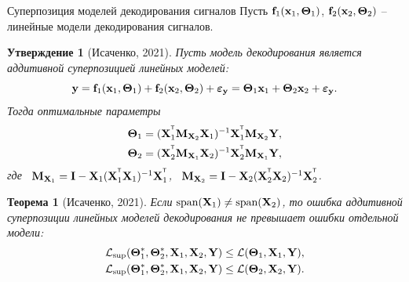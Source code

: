 \documentclass[10pt]{beamer}
\newtheorem{statement}{Утверждение}
\newtheorem{rustheorem}{Теорема}
\begin{document}
\begin{frame}{Суперпозиция моделей декодирования сигналов}
	Пусть $\mathbf{f}_1(\bx_1, \bTheta_1)$, $\mathbf{f}_2(\bx_2, \bTheta_2)$ -- линейные модели декодирования сигналов. 
	\begin{statement}[Исаченко, 2021]
		Пусть модель декодирования является аддитивной суперпозицией линейных моделей:
		\vspace{-0.3cm}
		\[
			\by = \mathbf{f}_1(\bx_1, \bTheta_1) + \mathbf{f}_2(\bx_2, \bTheta_2) + \boldsymbol{\varepsilon}_{\by} = \bTheta_1 \bx_1 + \bTheta_2 \bx_2 + \boldsymbol{\varepsilon}_{\by}.
		\]
		Тогда оптимальные параметры
		\vspace{-0.2cm}
		\begin{align*}
			\bTheta_1 &= (\bX_1^{\T} \bM_{\bX_2} \bX_1)^{-1} \bX_1^{\T} \bM_{\bX_2} \bY, \\
			\bTheta_2 &= (\bX_2^{\T} \bM_{\bX_1} \bX_2)^{-1} \bX_2^{\T} \bM_{\bX_1} \bY,
		\end{align*}
		где \, $\bM_{\bX_1} = \bI - \bX_1 (\bX_1^{\T} \bX_1)^{-1} \bX_1^{\T}$, \, $\bM_{\bX_2} = \bI -\bX_2 (\bX_2^{\T} \bX_2)^{-1} \bX_2^{\T}$.
	\end{statement}
	\begin{rustheorem}[Исаченко, 2021]
		Если $\text{span}(\bX_1) \neq \text{span}(\bX_2)$, то ошибка аддитивной суперпозиции линейных моделей декодирования не превышает ошибки отдельной модели:
		\begin{align*}
			\mathcal{L}_{\textnormal{sup}}(\bTheta_1^*, \bTheta_2^*, \bX_1, \bX_2, \bY) &\leq \mathcal{L}(\bTheta_1, \bX_1, \bY), \\
			\mathcal{L}_{\textnormal{sup}}(\bTheta_1^*, \bTheta_2^*, \bX_1, \bX_2, \bY) &\leq \mathcal{L}(\bTheta_2, \bX_2, \bY).
		\end{align*}
	\end{rustheorem}
\end{frame}
\end{document}
